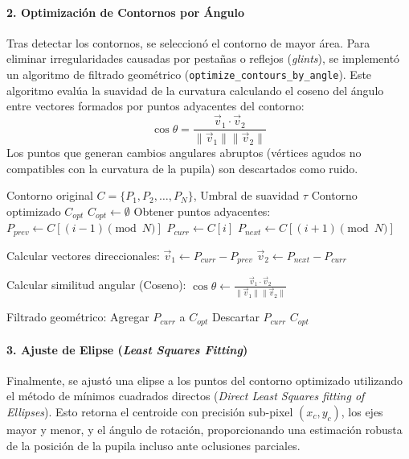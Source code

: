 \paragraph{2. Optimización de Contornos por Ángulo}
Tras detectar los contornos, se seleccionó el contorno de mayor área.
Para eliminar irregularidades causadas por pestañas o reflejos (\textit{glints}), se implementó un algoritmo de filtrado geométrico (\texttt{optimize\_contours\_by\_angle}).
Este algoritmo evalúa la suavidad de la curvatura calculando el coseno del ángulo entre vectores formados por puntos adyacentes del contorno:
\begin{equation}
	\cos \theta = \frac{\vec{v}_1 \cdot \vec{v}_2}{\|\vec{v}_1\| \|\vec{v}_2\|}
\end{equation}
Los puntos que generan cambios angulares abruptos (vértices agudos no compatibles con la curvatura de la pupila) son descartados como ruido.

\begin{algorithm}[H]
	\caption{Optimización de Contornos por Suavidad Angular}
	\label{alg:optimize_contours}
	\begin{algorithmic}[1]
		\Require Contorno original $C = \{P_1, P_2, \dots, P_N\}$, Umbral de suavidad $\tau$
		\Ensure Contorno optimizado $C_{opt}$
		\State $C_{opt} \gets \emptyset$
		\State Obtener puntos adyacentes:
		\State $P_{prev} \gets C[(i-1) \pmod N]$
		\State $P_{curr} \gets C[i]$
		\State $P_{next} \gets C[(i+1) \pmod N]$
		
		\State Calcular vectores direccionales:
		\State $\vec{v}_1 \gets P_{curr} - P_{prev}$
		\State $\vec{v}_2 \gets P_{next} - P_{curr}$
		
		\State Calcular similitud angular (Coseno):
		\State $\cos \theta \gets \frac{\vec{v}_1 \cdot \vec{v}_2}{\|\vec{v}_1\| \|\vec{v}_2\|}$
		
		\State Filtrado geométrico:
		\If{$\cos \theta > \tau$} 
		\State Agregar $P_{curr}$ a $C_{opt}$
		\Else
		\State Descartar $P_{curr}$ 
		\EndIf
		\EndFor
		\State \Return $C_{opt}$
	\end{algorithmic}
\end{algorithm}

\paragraph{3. Ajuste de Elipse (\textit{Least Squares Fitting})}
Finalmente, se ajustó una elipse a los puntos del contorno optimizado utilizando el método de mínimos cuadrados directos (\textit{Direct Least Squares fitting of Ellipses}).
Esto retorna el centroide con precisión sub-pixel $(x_c, y_c)$, los ejes mayor y menor, y el ángulo de rotación, proporcionando una estimación robusta de la posición de la pupila incluso ante oclusiones parciales.

